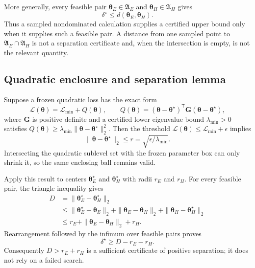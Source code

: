 More generally, every feasible pair
$\bm\theta_E\in\mathfrak A_E$ and
$\bm\theta_H\in\mathfrak A_H$ gives
\begin{equation}
 \delta^\star\leq d(\bm\theta_E,\bm\theta_H).
 \label{eq:app-b-feasible-upper}
\end{equation}
Thus a sampled nondominated calculation supplies a certified upper bound only
when it supplies such a feasible pair. A distance from one sampled point to
$\mathfrak A_E\cap\mathfrak A_H$ is not a separation certificate and, when the
intersection is empty, is not the relevant quantity.

\subsection{Quadratic enclosure and separation lemma}

Suppose a frozen quadratic loss has the exact form
\begin{equation}
 \mathcal L(\bm\theta)=\mathcal L_{\min}
 +Q(\bm\theta),\qquad
 Q(\bm\theta)=(\bm\theta-\bm\theta^\star)^{\mathsf T}
 \bm G(\bm\theta-\bm\theta^\star),
 \label{eq:app-b-quadratic}
\end{equation}
where $\bm G$ is positive definite and a certified lower eigenvalue bound
$\lambda_{\min}>0$ satisfies
$Q(\bm\theta)\geq\lambda_{\min}
\|\bm\theta-\bm\theta^\star\|_2^2$. Then the threshold
$\mathcal L(\bm\theta)\leq\mathcal L_{\min}+\epsilon$ implies
\begin{equation}
 \|\bm\theta-\bm\theta^\star\|_2
 \leq r=\sqrt{\epsilon/\lambda_{\min}}.
 \label{eq:app-b-radius}
\end{equation}
Intersecting the quadratic sublevel set with the frozen parameter box can only
shrink it, so the same enclosing ball remains valid.

Apply this result to centers $\bm\theta_E^\star$ and
$\bm\theta_H^\star$ with radii $r_E$ and $r_H$. For every feasible pair, the
triangle inequality gives
\begin{align*}
 D&=\|\bm\theta_E^\star-\bm\theta_H^\star\|_2\\
 &\leq
 \|\bm\theta_E^\star-\bm\theta_E\|_2
 +\|\bm\theta_E-\bm\theta_H\|_2
 +\|\bm\theta_H-\bm\theta_H^\star\|_2\\
 &\leq r_E+\|\bm\theta_E-\bm\theta_H\|_2+r_H.
\end{align*}
Rearrangement followed by the infimum over feasible pairs proves
\begin{equation}
 \delta^\star\geq D-r_E-r_H.
 \label{eq:app-b-reverse-triangle}
\end{equation}
Consequently $D>r_E+r_H$ is a sufficient certificate of positive separation;
it does not rely on a failed search.

